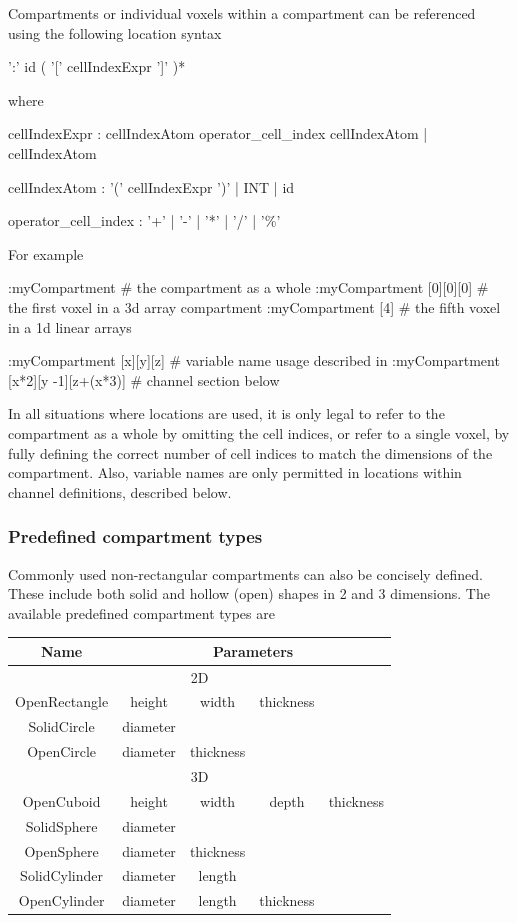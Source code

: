 Compartments or individual voxels within a compartment can be referenced using the following location syntax
\begin{bnfsource}
':' id ( '[' cellIndexExpr ']' )*
\end{bnfsource}
where
\begin{bnfsource}
cellIndexExpr :
  cellIndexAtom operator_cell_index cellIndexAtom
  | cellIndexAtom
  
cellIndexAtom :
  '(' cellIndexExpr ')'
  | INT
  | id
  
operator_cell_index :
  '+' | '-' | '*' | '/' | '\%'
\end{bnfsource}
For example
\begin{kappasource}
:myCompartment                     # the compartment as a whole
:myCompartment [0][0][0]           # the first voxel in a 3d array compartment
:myCompartment [4]                 # the fifth voxel in a 1d linear arrays

:myCompartment [x][y][z]           # variable name usage described in
:myCompartment [x*2][y -1][z+(x*3)] #   channel section below
\end{kappasource}

In all situations where locations are used, it is only legal to refer to the compartment as a whole by omitting the cell indices, or refer to a single voxel, by fully defining the correct number of cell indices to match the dimensions of the compartment. Also, variable names are only permitted in locations within channel definitions, described below.

\subsubsection{Predefined compartment types}

Commonly used non-rectangular compartments can also be concisely defined. These include both solid and hollow (open) shapes in 2 and 3 dimensions. The available predefined compartment types are

\medskip 

\begin{tabular}{|c|cccc|}
\hline
Name & \multicolumn{4}{|c|}{Parameters}\\ 
\hline
\multicolumn{5}{|c|}{2D}\\
\hline
OpenRectangle & height & width & thickness & \\
SolidCircle & diameter &  &  & \\
OpenCircle & diameter & thickness &  & \\
\hline
\multicolumn{5}{|c|}{3D}\\
\hline
OpenCuboid & height & width & depth & thickness\\
SolidSphere & diameter &  &  &  \\
OpenSphere & diameter & thickness &  & \\
SolidCylinder & diameter & length & & \\
OpenCylinder & diameter & length & thickness & \\
\hline
\end{tabular} 

